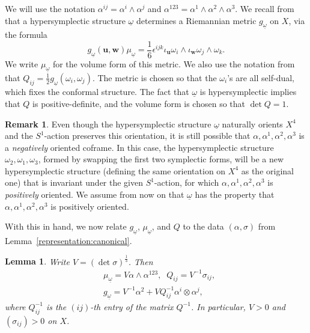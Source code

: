 \documentclass[11pt]{amsart}
\theoremstyle{plain}
\newtheorem{lemma}[theorem]{Lemma}
\theoremstyle{definition}
\newtheorem{remark}[theorem]{Remark}
\theoremstyle{plain}
\theoremstyle{definition}
\numberwithin{equation}{section}
\numberwithin{theorem}{section}
\begin{document}
We will use the notation $\alpha^{ij} = \alpha^i \wedge \alpha^j$ and $\alpha^{123} = \alpha^1 \wedge \alpha^2 \wedge \alpha^3$. We recall from~\cite{FY} that a hypersymplectic structure $\underline{\omega}$ determines a Riemannian metric $g_{\underline{\omega}}$ on $X$, via the formula
\begin{equation}
        g_{\underline\omega}(\bm u, \bm w)\mu_{\underline\omega}
        = 
        \frac{1}{6}\epsilon^{ijk}\iota_{\bm u}\omega_i\wedge\iota_{\bm w}\omega_j\wedge\omega_k.
	\label{g-formula}
\end{equation}
We write $\mu_{\underline{\omega}}$ for the volume form of this metric. We also use the notation from~\cite{FY} that $Q_{ij} = \frac{1}{2} g_{\underline{\omega}}(\omega_i,\omega_j)$. The metric is chosen so that the $\omega_i$'s are all self-dual, which fixes the conformal structure. The fact that $\underline{\omega}$ is hypersymplectic implies that $Q$ is positive-definite, and the volume form is chosen so that $\det Q = 1$.

\begin{remark}
Even though the hypersymplectic structure $\underline\omega$ naturally orients $X^4$ and the $S^1$-action preserves this orientation, it is still possible that $\alpha, \alpha^1, \alpha^2,\alpha^3$ is a \emph{negatively} oriented coframe.  In this case, the hypersymplectic structure $\omega_2, \omega_1, \omega_3$, formed by swapping the first two symplectic forms, will be a new hypersymplectic structure (defining the same orientation on $X^4$ as the original one) that is invariant under the given $S^1$-action, for which $\alpha, \alpha^1,\alpha^2,\alpha^3$ is \emph{positively} oriented. We assume from now on that $\underline{\omega}$ has the property that $\alpha, \alpha^1, \alpha^2, \alpha^3$ is positively oriented.
\end{remark}


With this  in hand, we now relate $g_{\underline{\omega}}$, $\mu_{\underline{\omega}}$, and $Q$ to the data $(\alpha, \sigma)$ from Lemma~\ref{representation:canonical}. 

\begin{lemma}
\label{lemma:metric-tensor}
    Write $V=\left(\det\sigma\right)^\frac{1}{3}$. Then 
\begin{equation} 
\begin{split}
    &\mu_{\underline\omega} = V\alpha\wedge \alpha^{123},\;\; Q_{ij}=V^{-1}\sigma_{ij},\\
&g_{\underline\omega}
= 
V^{-1} \alpha^2 + V Q^{-1}_{ij}\alpha^i\otimes \alpha^j,
\end{split}
\end{equation}
where $Q_{ij}^{-1}$ is the $(ij)$-th entry of the matrix $Q^{-1}$. In particular, $V>0$ and $\left(\sigma_{ij}\right)>0$ on $X$.
\end{lemma}
\end{document}
